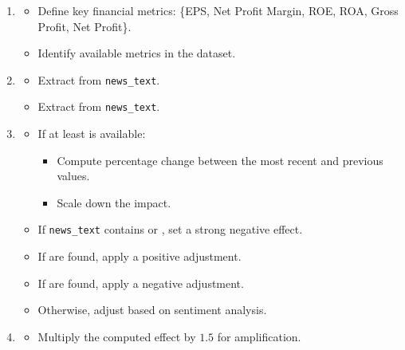 \documentclass[3p,times,procedia]{elsarticle}
\begin{document}
\begin{enumerate}
    \item {}
    \begin{itemize}
        \item Define key financial metrics: 
        \{EPS, Net Profit Margin, ROE, ROA, Gross Profit, Net Profit\}.
        \item Identify available metrics in the dataset.
    \end{itemize}

    \item {}
    \begin{itemize}
        \item Extract  from \texttt{news\_text}.
        \item Extract  from \texttt{news\_text}.
    \end{itemize}


    \item {}
    \begin{itemize}
        \item If at least  is available:
        \begin{itemize}
            \item Compute percentage change between the most recent and previous values.
            \item Scale down the impact.
        \end{itemize}
        \item If \texttt{news\_text} contains  or , set a strong negative effect.
        \item If  are found, apply a positive adjustment.
        \item If  are found, apply a negative adjustment.
        \item Otherwise, adjust based on sentiment analysis.
    \end{itemize}

    \item {}
    \begin{itemize}
        \item Multiply the computed effect by $1.5$ for amplification.
    \end{itemize}
\end{enumerate}
\end{document}
